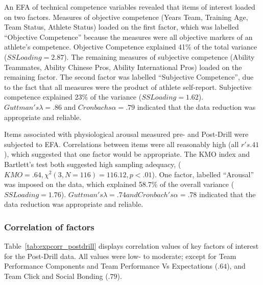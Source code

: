 \begin{CJK}{UTF8}{gbsn}
An EFA of technical competence variables revealed that items of interest loaded on two factors. Measures of objective competence (Years Team, Training Age, Team Status, Athlete Status) loaded on the first factor, which was labelled ``Objective Competence'' because the measures were all objective markers of an athlete's competence.
Objective Competence explained 41\% of the total variance ($SS Loading = 2.87$).  The remaining measures of subjective competence (Ability Teammates, Ability Chinese Pros, Ability International Pros) loaded on the remaining factor.  The second factor was labelled ``Subjective Competence'', due to the fact that all measures were the product of athlete self-report.  Subjective competence explained 23\% of the variance ($SS Loading = 1.62$).  $Guttman's \lambda = .86$ and $Cronbachs \alpha = .79$ indicated that the data reduction was appropriate and reliable.

Items associated with physiological arousal measured pre- and Post-Drill were subjected to EFA.
Correlations between items were all reasonably high (all $r's  .41$), which suggested that one factor would be appropriate. The KMO index and Bartlett's test both suggested high sampling adequacy, ($KMO = .64, \chi^2(3, N = 116) = 116.12, p < .01$).  One factor, labelled ``Arousal'' was imposed on the data, which explained 58.7\% of the overall variance ($SS Loading = 1.76$).  $Guttman's \lambda = .74 and  Cronbach's \alpha = .78$  indicated that the data reduction was appropriate and reliable.






\subsubsection{Correlation of factors}
Table~\ref{tab:expcorr_postdrill} displays correlation values of key factors of interest for the Post-Drill data.  All values were low- to moderate; except for Team Performance Components and Team Performance Vs Expectations ($.64$), and Team Click and Social Bonding ($.79$).



\end{CJK}
